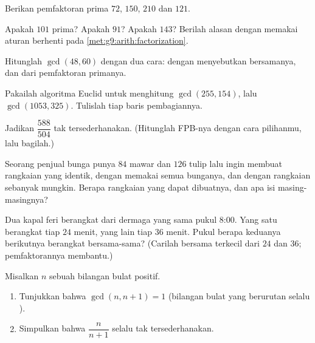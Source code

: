 \begin{exercise}[$\star$]\label{exo:g9:arith:3}
Berikan pemfaktoran prima $72$, $150$, $210$ dan $121$.
\end{exercise}

\begin{exercise}[$\star$]\label{exo:g9:arith:4}
Apakah $101$ prima? Apakah $91$? Apakah $143$? Berilah alasan dengan
memakai aturan berhenti pada \cref{met:g9:arith:factorization}.
\end{exercise}

\begin{exercise}[$\star$]\label{exo:g9:arith:5}
Hitunglah $\gcd(48, 60)$ dengan dua cara: dengan menyebutkan 
bersamanya, dan dari pemfaktoran primanya.
\end{exercise}

\begin{exercise}[$\star\star$]\label{exo:g9:arith:6}
Pakailah algoritma Euclid untuk menghitung $\gcd(255, 154)$, lalu
$\gcd(1053, 325)$. Tulislah tiap baris pembagiannya.
\end{exercise}

\begin{exercise}[$\star\star$]\label{exo:g9:arith:7}
Jadikan  $\dfrac{588}{504}$ tak tersederhanakan. (Hitunglah
FPB-nya dengan cara pilihanmu, lalu bagilah.)
\end{exercise}

\begin{exercise}[$\star\star$]\label{exo:g9:arith:8}
Seorang penjual bunga punya $84$ mawar dan $126$ tulip lalu ingin
membuat rangkaian yang identik, dengan memakai semua bunganya, dan
dengan rangkaian sebanyak mungkin. Berapa rangkaian yang dapat
dibuatnya, dan apa isi masing-masingnya?
\end{exercise}

\begin{exercise}[$\star\star$]\label{exo:g9:arith:9}
Dua kapal feri berangkat dari dermaga yang sama pukul 8:00. Yang satu
berangkat tiap $24$ menit, yang lain tiap $36$ menit. Pukul berapa
keduanya berikutnya berangkat bersama-sama? (Carilah 
bersama terkecil dari $24$ dan $36$; pemfaktorannya membantu.)
\end{exercise}

\begin{exercise}[$\star\star\star$]\label{exo:g9:arith:10}
Misalkan $n$ sebuah bilangan bulat positif.
\begin{enumerate}
  \item Tunjukkan bahwa $\gcd(n, n+1) = 1$ (bilangan bulat yang
        berurutan selalu ).
  \item Simpulkan bahwa  $\dfrac{n}{n+1}$ selalu tak tersederhanakan.
\end{enumerate}
\end{exercise}

